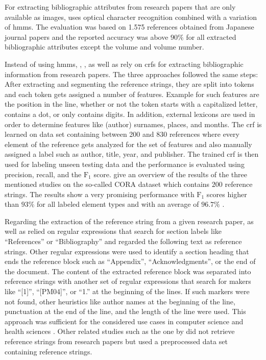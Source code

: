 For extracting bibliographic attributes from research papers that are only available as images, \citet{takasu2003bibliographic} uses optical character recognition combined with a variation of \glspl{hmm}.
The evaluation was based on \num{1,575} references obtained from Japanese journal papers and the reported accuracy was above $90\%$ for all extracted bibliographic attributes except the volume and volume number.

Instead of using \glspl{hmm}, \citet{peng2004accurate}, \citet{councill2008parscit}, as well as \citet{groza2012reference} rely on \glspl{crf} for extracting bibliographic information from research papers.
The three approaches followed the same steps:
After extracting and segmenting the reference strings, they are split into tokens and each token gets assigned a number of features.
Example for such features are the position in the line, whether or not the token starts with a capitalized letter, contains a dot, or only contains digits.
In addition, external lexicons are used in order to determine features like (author) surnames, places, and months.
The \gls{crf} is learned on data set containing between 200 and 830 references where every element of the reference gets analyzed for the set of features and also manually assigned a label such as author, title, year, and publisher.
The trained \gls{crf} is then used for labeling unseen testing data and the performance is evaluated using precision, recall, and the $\text{F}_1$ score.
\citet{groza2012reference} give an overview of the results of the three mentioned studies on the so-called CORA dataset which contains $200$ reference strings.
The results show a very promising performance with $\text{F}_1$ scores higher than $93\%$ for all labeled element types and with an average of $96.7\%$ \citep{groza2012reference}.

Regarding the extraction of the reference string from a given research paper, \citet{councill2008parscit} as well as \citet{groza2012reference} relied on regular expressions that search for section labels like ``References'' or ``Bibliography'' and regarded the following text as reference strings.
Other regular expressions were used to identify a section heading that ends the reference  block such as ``Appendix'', ``Acknowledgments'', or the end of the document.
The content of the extracted reference block was separated into reference strings with another set of regular expressions that search for makers like ``[1]'', ``[PM04]'', or ``1.'' at the beginning of the lines.
If such markers were not found, other heuristics like author names at the beginning of the line, punctuation at the end of the line, and the length of the line were used.
This approach was sufficient for the considered use cases in computer science and health sciences \citep{councill2008parscit,groza2012reference}.
Other related studies such as the one by \citet{peng2004accurate} did not retrieve reference strings from research papers but used a preprocessed data set containing reference strings.

